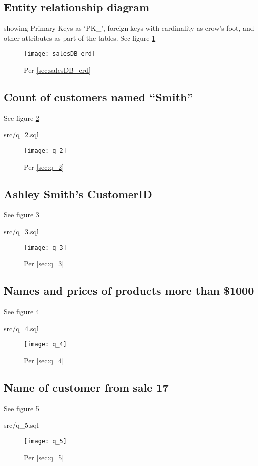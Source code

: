 \documentclass{article}
\begin{document}
\subsection{Entity relationship diagram} showing Primary Keys as `PK\_', foreign
keys with cardinality as crow's foot, and other attributes as part of the
tables. See figure \ref{fig:salesDB_erd}
\label{sec:salesDB_erd}
\begin{figure}[H]\centering
	\caption{Per \ref{sec:salesDB_erd}}
	\texttt{[image: salesDB\_erd]}
	\label{fig:salesDB_erd}
\end{figure}

\subsection{Count of customers named ``Smith''}
See figure \ref{fig:q_2}
\label{sec:q_2}
\begin{lstinputlisting}[float]{src/q_2.sql}
\end{lstinputlisting}
\begin{figure}[H]\centering
	\caption{Per \ref{sec:q_2}}
	\texttt{[image: q\_2]}
	\label{fig:q_2}
\end{figure}

\subsection{Ashley Smith's CustomerID}
See figure \ref{fig:q_3}
\label{sec:q_3}
\begin{lstinputlisting}[float]{src/q_3.sql}
\end{lstinputlisting}
\begin{figure}[H]\centering
	\caption{Per \ref{sec:q_3}}
	\texttt{[image: q\_3]}
	\label{fig:q_3}
\end{figure}

\subsection{Names and prices of products more than \$1000}
See figure \ref{fig:q_4}
\label{sec:q_4}
\begin{lstinputlisting}[float]{src/q_4.sql}
\end{lstinputlisting}
\begin{figure}[H]\centering
	\caption{Per \ref{sec:q_4}}
	\texttt{[image: q\_4]}
	\label{fig:q_4}
\end{figure}

\subsection{Name of customer from sale 17}
See figure \ref{fig:q_5}
\label{sec:q_5}
\begin{lstinputlisting}[float]{src/q_5.sql}
\end{lstinputlisting}
\begin{figure}[H]\centering
	\caption{Per \ref{sec:q_5}}
	\texttt{[image: q\_5]}
	\label{fig:q_5}
\end{figure}
\end{document}
